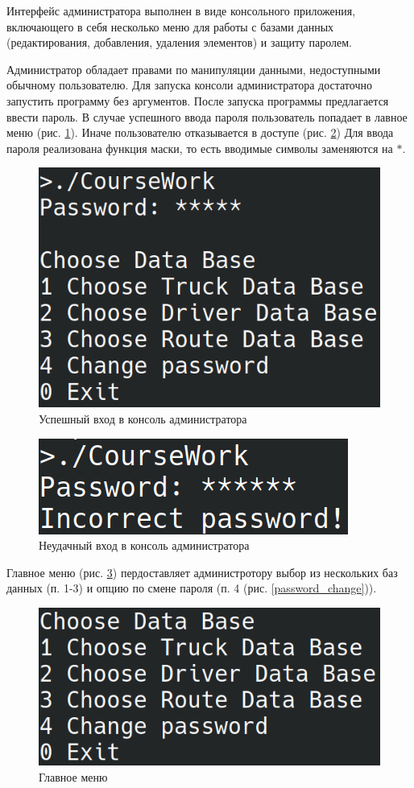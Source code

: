 Интерфейс администратора выполнен в виде консольного приложения, 
включающего в себя несколько меню для работы с 
базами данных 
(редактирования, добавления, удаления элементов) 
и защиту паролем. 

Администратор обладает правами по манипуляции данными, 
недоступными обычному пользователю. 
Для запуска консоли администратора достаточно 
запустить программу без аргументов. 
После запуска программы предлагается ввести пароль.
В случае успешного ввода пароля пользователь
попадает в лавное меню
(рис. \ref{password_good}).
Иначе пользователю отказывается в доступе
(рис. \ref{password_bad})
Для ввода пароля реализована функция маски,
то есть вводимые символы заменяются на $ * $.

\begin{figure}[hpt!]
    \centering
    \includegraphics[width=0.7\linewidth]{photo/interface/password_good}
    \caption{Успешный вход в консоль администратора}
    \label{password_good}
\end{figure}

\begin{figure}[hpt!]
    \centering
    \includegraphics[width=0.7\linewidth]{photo/interface/password_bad}
    \caption{Неудачный вход в консоль администратора}
    \label{password_bad}
\end{figure}

Главное меню (рис. \ref{menu_main}) пердоставляет администротору 
выбор из нескольких баз данных (п. 1-3) и
опцию по смене пароля (п. 4 (рис. \ref{password_change})).

\begin{figure}[H]
    \centering
    \includegraphics[width=0.7\linewidth]{photo/interface/menu_main}
    \caption{Главное меню}
    \label{menu_main}
\end{figure}

